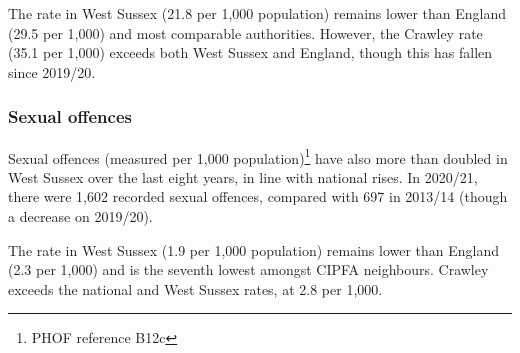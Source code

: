 The rate in West Sussex (21.8 per 1,000 population) remains lower than England (29.5 per 1,000) and most comparable authorities. However, the Crawley rate (35.1 per 1,000) exceeds both West Sussex and England, though this has fallen since 2019/20.




\subsubsection{Sexual offences} Sexual offences (measured per 1,000 population)\footnote{PHOF reference B12c} have also more than doubled in West Sussex over the last eight years, in line with national rises. In 2020/21, there were 1,602 recorded sexual offences, compared with 697 in 2013/14 (though a decrease on 2019/20).

The rate in West Sussex (1.9 per 1,000 population) remains lower than England (2.3 per 1,000) and is the seventh lowest amongst CIPFA neighbours. Crawley exceeds the national and West Sussex rates, at 2.8 per 1,000.




